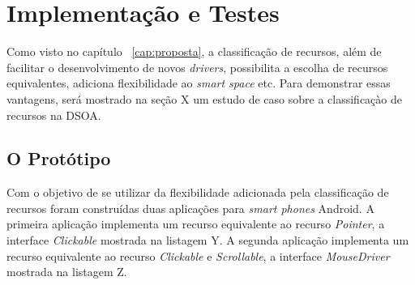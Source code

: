 \chapter{Implementação e Testes}

Como visto no capítulo ~\ref{cap:proposta}, a classificação de recursos, além de facilitar o desenvolvimento de novos \emph{drivers}, possibilita a escolha de recursos equivalentes, adiciona flexibilidade ao \emph{smart space} etc. Para demonstrar essas vantagens, será mostrado na seção X um estudo de caso sobre a classificaçào de recursos na DSOA.

\section{O Protótipo}
Com o objetivo de se utilizar da flexibilidade adicionada pela classificação de recursos foram construídas duas aplicações para \emph{smart phones} Android. A primeira aplicação implementa um recurso equivalente ao recurso \emph{Pointer}, a interface \emph{Clickable} mostrada na listagem Y. A segunda aplicação implementa um recurso equivalente ao recurso \emph{Clickable} e \emph{Scrollable}, a interface \emph{MouseDriver} mostrada na listagem Z.